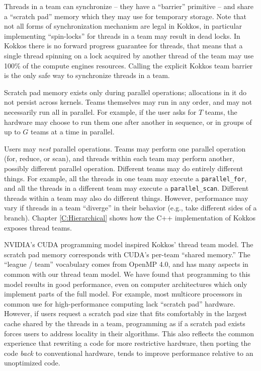 Threads in a team can synchronize -- they have a ``barrier'' primitive -- 
and share a ``scratch pad'' memory which they may use for temporary storage.
Note that not all forms of synchronization mechanism are legal in Kokkos, in particular
implementing ``spin-locks'' for threads in a team may result in dead locks. 
In Kokkos there is no forward progress guarantee for threads, that means that a single thread spinning
on a lock acquired by another thread of the team may use 100\% of the compute engines resources.
Calling the explicit Kokkos team barrier is the only safe way to synchronize threads in a team.

Scratch pad memory exists only during parallel operations;
allocations in it do not persist across kernels.
Teams themselves may run in any order,
and may not necessarily run all in parallel.
For example, if the user asks for $T$ teams,
the hardware may choose to run them one after another in sequence,
or in groups of up to $G$ teams at a time in parallel.

Users may \emph{nest} parallel operations.
Teams may perform one parallel operation (for, reduce, or scan),
and threads within each team may perform another, possibly different parallel operation.
Different teams may do entirely different things.
For example, all the threads in one team may execute a \lstinline!parallel_for!,
and all the threads in a different team may execute a \lstinline!parallel_scan!.
Different threads within a team may also do different things.
However, performance may vary if threads in a team ``diverge'' in their behavior
(e.g., take different sides of a branch).
Chapter \ref{C:Hierarchical} shows how the C++ implementation of Kokkos exposes thread teams.

NVIDIA's CUDA programming model inspired Kokkos' thread team model.
The scratch pad memory corresponds with CUDA's per-team ``shared memory.''
The ``league / team'' vocabulary comes from OpenMP 4.0,
and has many aspects in common with our thread team model.
We have found that programming to this model results in good performance,
even on computer architectures which only implement parts of the full model.
For example, most multicore processors in common use for high-performance computing lack ``scratch pad'' hardware.
However, if users request a scratch pad size that fits comfortably in the largest cache shared by the threads in a team,
programming as if a scratch pad exists forces users to address locality in their algorithms.
This also reflects the common experience that rewriting a code for more restrictive hardware,
then porting the code \emph{back} to conventional hardware,
tends to improve performance relative to an unoptimized code.

